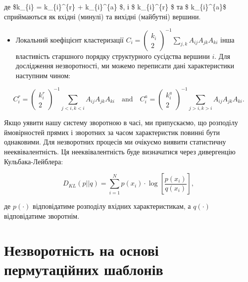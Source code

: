 \documentclass[
  letterpaper,
]{report}
\providecommand{\tightlist}{%
  \setlength{\itemsep}{0pt}\setlength{\parskip}{0pt}}\usepackage{longtable,booktabs,array}
\begin{document}
де \$k\_\{i\} = k\_\{i\}\^{}\{r\} + k\_\{i\}\^{}\{a\} \$, і \$
k\_\{i\}\^{}\{r\} \$ та \$ k\_\{i\}\^{}\{a\}\$ сприймаються як вхідні
(минулі) та вихідні (майбутні) вершини.

\begin{itemize}
\tightlist
\item
  Локальний коефіцієнт кластеризації
  \(C_{i} = \left( \begin{matrix} k_{i}\\ 2 \end{matrix} \right)^{-1} \sum_{j,k} A_{ij}A_{jk}A_{ki}\)
  інша властивість старшного порядку структурного сусідства вершини
  \(i\). Для дослідження незворотності, ми можемо переписати дані
  характеристики наступним чином:
\end{itemize}

\[ 
C_{i}^{r} = \left( \begin{matrix} k_{i}^{r}\\ 2 \end{matrix} \right)^{-1} \sum_{j<i,k<i} A_{ij}A_{jk}A_{ki} \quad \textrm{and} \quad C_{i}^{a} = \left( \begin{matrix} k_{i}^{a}\\ 2 \end{matrix} \right)^{-1} \sum_{j>i,k>i} A_{ij}A_{jk}A_{ki}. 
\]

Якщо уявити нашу систему зворотною в часі, ми припускаємо, що розподілу
ймовірностей прямих і зворотних за часом характеристик повинні бути
однаковими. Для незворотних процесів ми очікуємо виявити статистичну
нееквівалентність. Ця нееквівалентність буде визначатися через
дивергенцію Кульбака-Лейблера:

\[ 
D_{KL}(p||q) = \sum_{i=1}^{N} p(x_{i}) \cdot \log{\left[ \frac{p(x_{i})}{q(x_{i})} \right]}, 
\]

де \(p(\cdot)\) відповідатиме розподілу вхідних характеристикам, а
\(q(\cdot)\) відповідатиме зворотнім.

\hypertarget{ux43dux435ux437ux432ux43eux440ux43eux442ux43dux456ux441ux442ux44c-ux43dux430-ux43eux441ux43dux43eux432ux456-ux43fux435ux440ux43cux443ux442ux430ux446ux456ux439ux43dux438ux445-ux448ux430ux431ux43bux43eux43dux456ux432}{%
\section{Незворотність на основі пермутаційних
шаблонів}\label{ux43dux435ux437ux432ux43eux440ux43eux442ux43dux456ux441ux442ux44c-ux43dux430-ux43eux441ux43dux43eux432ux456-ux43fux435ux440ux43cux443ux442ux430ux446ux456ux439ux43dux438ux445-ux448ux430ux431ux43bux43eux43dux456ux432}}
\end{document}

